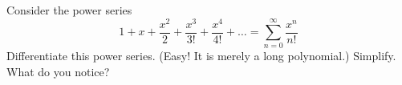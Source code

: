 Consider the power series
  $$1 + x + \frac{x^2}{2} + \frac{x^3}{3!} + \frac{x^4}{4!} + \dots = \sum_{n=0}^\infty \frac{x^n}{n!}$$
Differentiate this power series.  (Easy!  It is merely a long polynomial.)  Simplify.  What do you notice?